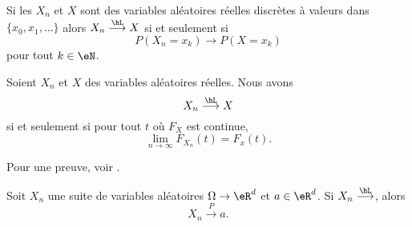 \begin{proposition}
    Si les \( X_n\) et \( X\) sont des variables aléatoires réelles discrètes à valeurs dans \( \{ x_0,x_1,\ldots \}\) alors \( X_n\stackrel{\hL}{\longrightarrow} X\) si et seulement si
    \begin{equation}
        P(X_n=x_k)\to P(X=x_k)
    \end{equation}
    pour tout \( k\in\eN\).
\end{proposition}

\begin{proposition}     \label{PropXncvXFXcvFxt}
    Soient \( X_n\) et \( X\) des variables aléatoires réelles. Nous avons
    \begin{equation}
        X_n\stackrel{\hL}{\longrightarrow}X
    \end{equation}
    si et seulement si pour tout \( t\) où \( F_X\) est continue,
    \begin{equation}
        \lim_{n\to \infty} F_{X_n}(t)=F_x(t).
    \end{equation}
\end{proposition}
Pour une preuve, voir \cite{CourgGudRennes}.

\begin{proposition}     \label{PropCvLfcvPsicst}
    Soit \( X_n\) une suite de variables aléatoires \( \Omega\to \eR^d\) et \( a\in\eR^d\). Si \( X_n\stackrel{\hL}{\longrightarrow}\), alors
    \begin{equation}
        X_n\stackrel{P}{\longrightarrow}a.
    \end{equation}
\end{proposition}

